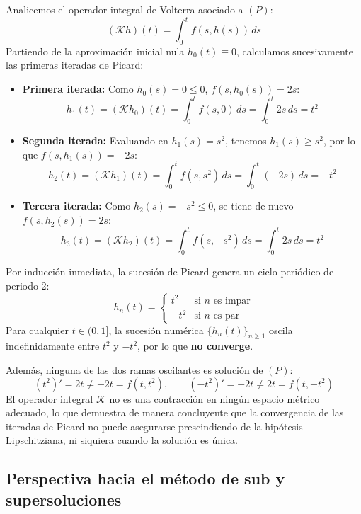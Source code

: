 {    Analicemos el operador integral de Volterra asociado a $(P)$:
    \[
        (\mathcal{K}h)(t) = \int_0^t f(s, h(s)) \, ds
    \]
    Partiendo de la aproximación inicial nula $h_0(t) \equiv 0$, calculamos sucesivamente las primeras iteradas de Picard:
    \begin{itemize}
        \item \textbf{Primera iterada:} Como $h_0(s) = 0 \leq 0$, $f(s, h_0(s)) = 2s$:
        \[
            h_1(t) = (\mathcal{K}h_0)(t) = \int_0^t f(s, 0) \, ds = \int_0^t 2s \, ds = t^2
        \]
        \item \textbf{Segunda iterada:} Evaluando en $h_1(s) = s^2$, tenemos $h_1(s) \geq s^2$, por lo que $f(s, h_1(s)) = -2s$:
        \[
            h_2(t) = (\mathcal{K}h_1)(t) = \int_0^t f(s, s^2) \, ds = \int_0^t (-2s) \, ds = -t^2
        \]
        \item \textbf{Tercera iterada:} Como $h_2(s) = -s^2 \leq 0$, se tiene de nuevo $f(s, h_2(s)) = 2s$:
        \[
            h_3(t) = (\mathcal{K}h_2)(t) = \int_0^t f(s, -s^2) \, ds = \int_0^t 2s \, ds = t^2
        \]
    \end{itemize}
    Por inducción inmediata, la sucesión de Picard genera un ciclo periódico de periodo 2:
    \[
        h_n(t) = \begin{cases}
            t^2 & \text{si } n \text{ es impar} \\
            -t^2 & \text{si } n \text{ es par}
        \end{cases}
    \]
    Para cualquier $t \in (0, 1]$, la sucesión numérica $\{h_n(t)\}_{n \geq 1}$ oscila indefinidamente entre $t^2$ y $-t^2$, por lo que \textbf{no converge}.
    
    Además, ninguna de las dos ramas oscilantes es solución de $(P)$:
    \[
        (t^2)' = 2t \neq -2t = f(t, t^2), \qquad (-t^2)' = -2t \neq 2t = f(t, -t^2)
    \]
    El operador integral $\mathcal{K}$ no es una contracción en ningún espacio métrico adecuado, lo que demuestra de manera concluyente que la convergencia de las iteradas de Picard no puede asegurarse prescindiendo de la hipótesis Lipschitziana, ni siquiera cuando la solución es única.
}

\subsection{Perspectiva hacia el método de sub y supersoluciones}

